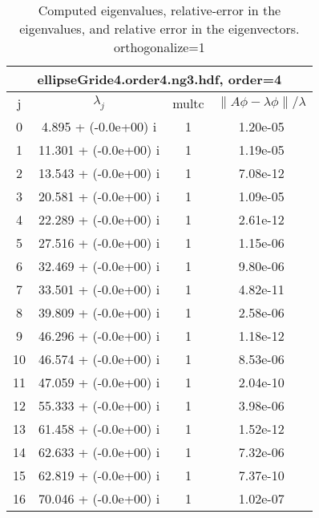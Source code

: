 \begin{table}[H]\tableFont %
\begin{center}
\begin{tabular}{|c|c|c|c|}  \hline
\multicolumn{4}{|c|}{ellipseGride4.order4.ng3.hdf, order=4} \\ \hline
   j    &         $\lambda_j$      & multc & $\| A\phi - \lambda\phi\|/\lambda$     \\ \hline
     0  &      4.895 + (-0.0e+00) i   &   1     &    1.20e-05   \\
     1  &     11.301 + (-0.0e+00) i   &   1     &    1.19e-05   \\
     2  &     13.543 + (-0.0e+00) i   &   1     &    7.08e-12   \\
     3  &     20.581 + (-0.0e+00) i   &   1     &    1.09e-05   \\
     4  &     22.289 + (-0.0e+00) i   &   1     &    2.61e-12   \\
     5  &     27.516 + (-0.0e+00) i   &   1     &    1.15e-06   \\
     6  &     32.469 + (-0.0e+00) i   &   1     &    9.80e-06   \\
     7  &     33.501 + (-0.0e+00) i   &   1     &    4.82e-11   \\
     8  &     39.809 + (-0.0e+00) i   &   1     &    2.58e-06   \\
     9  &     46.296 + (-0.0e+00) i   &   1     &    1.18e-12   \\
    10  &     46.574 + (-0.0e+00) i   &   1     &    8.53e-06   \\
    11  &     47.059 + (-0.0e+00) i   &   1     &    2.04e-10   \\
    12  &     55.333 + (-0.0e+00) i   &   1     &    3.98e-06   \\
    13  &     61.458 + (-0.0e+00) i   &   1     &    1.52e-12   \\
    14  &     62.633 + (-0.0e+00) i   &   1     &    7.32e-06   \\
    15  &     62.819 + (-0.0e+00) i   &   1     &    7.37e-10   \\
    16  &     70.046 + (-0.0e+00) i   &   1     &    1.02e-07   \\
\hline
\end{tabular}
\caption{Computed eigenvalues, relative-error in the eigenvalues, and relative error in the eigenvectors. orthogonalize=1}\label{table:genEigsellipseGride4.order4.ng3.hdf}
\end{center}
\end{table}
